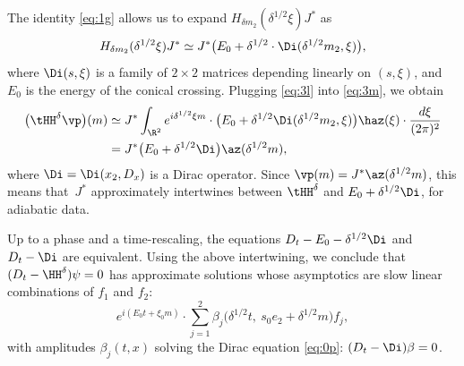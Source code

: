 The identity \eqref{eq:1g} allows us to expand $H_{\delta m_2}(\delta^{1/2} \xi) J^*$ as
\begin{equation}\label{eq:3l}
H_{\delta m_2}(\delta^{1/2} \xi) J^* \simeq J^* \bigl( E_0 + \delta^{1/2} \cdot \Di(\delta^{1/2} m_2, \xi) \bigr),
\end{equation}
where $\Di(s,\xi)$ is a family of $2 \times 2$ matrices depending linearly on $(s,\xi)$, and $E_0$ is the energy of the conical crossing. Plugging \eqref{eq:3l} into \eqref{eq:3m}, we obtain
\begin{align*}
\bigl(\tHH^\delta \vp \bigr)(m) &\simeq J^*\int_{\R^2} e^{i\delta^{1/2} \xi m} \cdot \bigl( E_0 + \delta^{1/2} \Di(\delta^{1/2} m_2, \xi) \bigr) \haz(\xi) \cdot \dfrac{d\xi}{(2\pi )^2}\\
&= J^* \bigl( E_0 + \delta^{1/2} \Di\bigr) \az (\delta^{1/2} m),
\end{align*}
where $\Di = \Di(x_2, D_x)$ is a Dirac operator. Since $\vp(m) = J^*\az(\delta^{1/2}m)$, this means that~$J^*$ approximately intertwines between $\tHH^\delta$ and $E_0 + \delta^{1/2} \Di$, for adiabatic data.

Up to a phase and a time-rescaling, the equations $D_t - E_0 - \delta^{1/2} \Di$ and $D_t - \Di$ are equivalent. Using the above intertwining, we conclude that
$(D_t-\HH^\delta) \psi = 0$ has approximate solutions whose asymptotics are slow linear combinations of $f_1$ and $f_2$:
\begin{equation*}
e^{i(E_0 t + \xi_0 m)} \cdot \sum_{j=1}^2 \beta_j\bigl( \delta^{1/2} t, \ s_0 e_2 + \delta^{1/2} m \bigr) f_j,
\end{equation*}
with amplitudes $\beta_j(t,x)$ solving the Dirac equation \eqref{eq:0p}: $(D_t - \Di) \beta = 0$.

